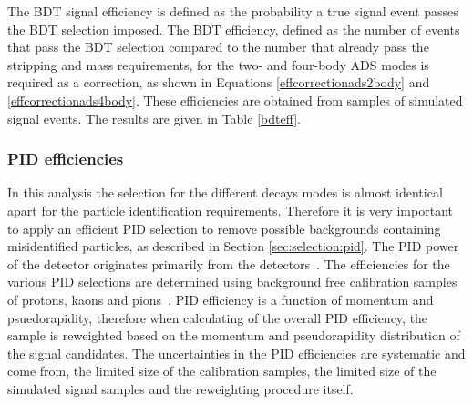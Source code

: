 The BDT signal efficiency is defined as the probability a true signal event passes the BDT selection imposed. The BDT efficiency, defined as the number of events that pass the BDT selection compared to the number that already pass the stripping and mass requirements, for the two- and four-body ADS modes is required as a correction, as shown in Equations \ref{effcorrectionads2body} and \ref{effcorrectionads4body}. These efficiencies are obtained from samples of simulated signal events. The results are given in Table \ref{bdteff}.

\begin{table}[h]
\centering
{}
\caption{Summary of the BDT efficiencies used in the \CP fit.}
\label{bdteff}
\end{table}


\subsubsection{PID efficiencies}
\label{sec:cpfit:efficiencies:pid}

In this analysis the selection for the different \Dz decays modes is almost identical apart for the particle identification requirements. Therefore it is very important to apply an efficient PID selection to remove possible backgrounds containing misidentified particles, as described in Section \ref{sec:selection:pid}. The PID power of the detector originates primarily from the \rich detectors~\cite{LHCb-DP-2012-003,LHCb-PUB-2017-012}. The efficiencies for the various PID selections are determined using background free calibration samples of protons, kaons and pions~\cite{LHCb-PUB-2016-021,LHCb-PUB-2016-005}. PID efficiency is a function of momentum and psuedorapidity, therefore when calculating of the overall PID efficiency, the sample is reweighted based on the momentum and pseudorapidity distribution of the signal candidates. The uncertainties in the PID efficiencies are systematic and come from, the limited size of the calibration samples, the limited size of the simulated signal samples and the reweighting procedure itself.

